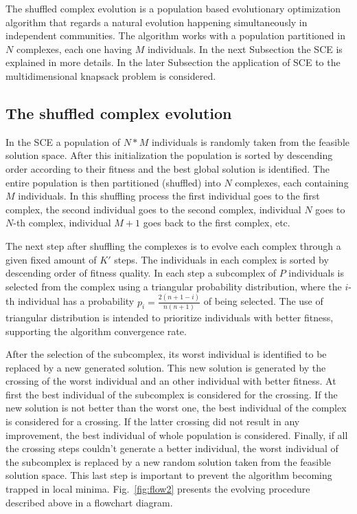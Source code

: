 The shuffled complex evolution is a population
based evolutionary optimization algorithm that regards a natural 
evolution happening simultaneously in independent communities.
The algorithm works with a population partitioned in $N$ complexes, each one
having $M$ individuals.
In the next Subsection the SCE is explained in more details.
In the later Subsection the application of SCE to the multidimensional knapsack
problem is considered.


\subsection{The shuffled complex evolution}
In the SCE a population of $N*M$ individuals is randomly taken from the
feasible solution space.
After this initialization the population is sorted by descending order according
to their fitness and the best global solution is identified.
The entire population is then partitioned (shuffled) into $N$ complexes,
each containing $M$ individuals.
In this shuffling process the first individual goes to the first complex, the second
individual goes to the second complex, individual $N$ goes to $N$-th complex,
individual $M+1$ goes back to the first complex, etc.

The next step after shuffling the complexes is to evolve each complex through
a given fixed amount of $K'$ steps.
The individuals in each complex is sorted by descending order of fitness quality.
In each step a subcomplex of $P$ individuals is selected from the
complex using a triangular probability distribution, where the $i$-th individual
has a probability $p_i = \frac{2(n+1-i)}{n(n+1)}$ of being selected.
The use of triangular distribution is intended to prioritize individuals with
better fitness, supporting the algorithm convergence rate.

After the selection of the subcomplex, its worst individual is identified to
be replaced by a new generated solution.
This new solution is generated by the crossing of the worst individual and an
other individual with better fitness.
At first the best individual of the subcomplex is considered for the crossing.
If the new solution is not better than the worst one, the best individual
of the complex is considered for a crossing.
If the latter crossing did not result in any improvement, the best individual
of whole population is considered.
Finally, if all the crossing steps couldn't generate a better individual,
the worst individual of the subcomplex is replaced by a new random solution taken
from the feasible solution space.
This last step is important to prevent the algorithm becoming trapped in local minima.
Fig.~\ref{fig:flow2} presents the evolving procedure described above in a flowchart diagram.


